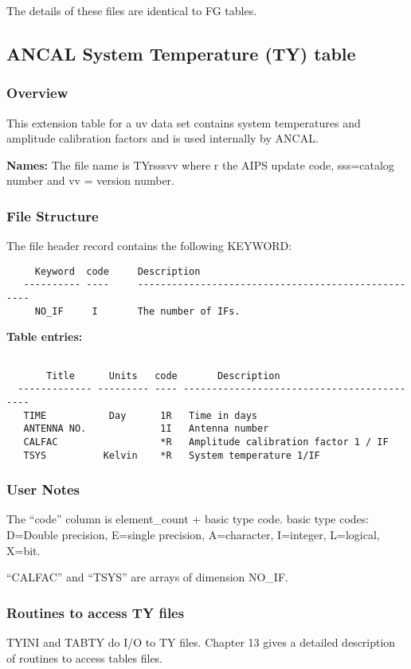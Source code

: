      The details of these files are identical to FG tables.

\subsection{ANCAL System Temperature (TY) table}
\subsubsection{Overview}

   This extension table for a uv data set contains system temperatures
and amplitude calibration factors and is used internally by ANCAL.

{\bf Names:} The file name is TYrsssvv where r the AIPS update code,
sss=catalog number and vv = version number.

\subsubsection{File Structure}

The file header record contains the following KEYWORD:

\begin{verbatim}
     Keyword  code     Description
   ---------- ----     ---------------------------------------------------
     NO_IF     I       The number of IFs.

\end{verbatim}

{\bf Table entries:}

\begin{verbatim}

       Title      Units   code       Description
  ------------- --------- ---- -------------------------------------------
   TIME           Day      1R   Time in days
   ANTENNA NO.             1I   Antenna number
   CALFAC                  *R   Amplitude calibration factor 1 / IF
   TSYS          Kelvin    *R   System temperature 1/IF

\end{verbatim}

\subsubsection{User Notes}

  The ``code'' column is element\_count + basic type code.
basic type codes: D=Double precision, E=single precision, A=character,
I=integer, L=logical, X=bit.

   ``CALFAC'' and ``TSYS'' are arrays of dimension NO\_IF.

\subsubsection{Routines to access TY files}

     TYINI and TABTY do I/O to TY files.
Chapter 13 gives a detailed description of routines to access tables
files.

\newpage


